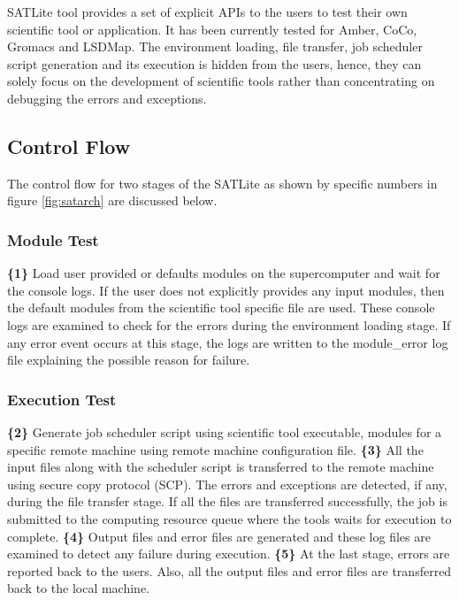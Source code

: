 \documentclass[10pt]{ruthesis}
\begin{document}
SATLite tool provides a set of explicit APIs to the users to test their own scientific tool or application. It has been currently tested for Amber, CoCo, Gromacs and LSDMap. The environment loading, file transfer, job scheduler script generation and its execution is hidden from the users, hence, they can solely focus on the development of scientific tools rather than concentrating on debugging the errors and exceptions.

\subsection{Control Flow}
The control flow for two stages of the SATLite as shown by specific numbers in figure \ref{fig:satarch} are discussed below.

\subsubsection{Module Test}
\textbf{\{1\}} Load user provided or defaults modules on the supercomputer and wait for the console logs. If the user does not explicitly provides any input modules, then the default modules from the scientific tool specific file are used. These console logs are examined to check for the errors during the environment loading stage. If any error event occurs at this stage, the logs are written to the module\_error log file explaining the possible reason for failure.

\subsubsection{Execution Test}
\textbf{\{2\}} Generate job scheduler script using scientific tool executable, modules for a specific remote machine using remote machine configuration file. \newline
\textbf{\{3\}} All the input files along with the scheduler script is transferred to the remote machine using secure copy protocol (SCP). The errors and exceptions are detected, if any, during the file transfer stage. If all the files are transferred successfully, the job is submitted to the computing resource queue where the tools waits for execution to complete.\newline
\textbf{\{4\}} Output files and error files are generated and these log files are examined to detect any failure during execution.\newline
\textbf{\{5\}} At the last stage, errors are reported back to the users. Also, all the output files and error files are transferred back to the local machine. 
\end{document}
